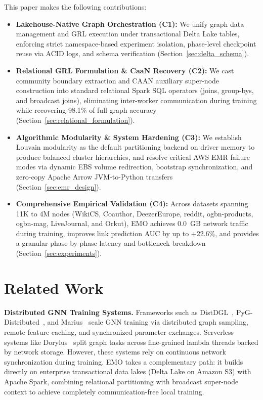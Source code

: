 \documentclass[conference,compsoc]{IEEEtran}
\begin{document}
This paper makes the following contributions:
\begin{itemize}
    \item \textbf{Lakehouse-Native Graph Orchestration (C1):} We unify graph data management and GRL execution under transactional Delta Lake tables, enforcing strict namespace-based experiment isolation, phase-level checkpoint reuse via ACID logs, and schema verification (Section~\ref{sec:delta_schema}).
    \item \textbf{Relational GRL Formulation \& CaaN Recovery (C2):} We cast community boundary extraction and CAAN auxiliary super-node construction into standard relational Spark SQL operators (joins, group-bys, and broadcast joins), eliminating inter-worker communication during training while recovering 98.1\% of full-graph accuracy (Section~\ref{sec:relational_formulation}).
    \item \textbf{Algorithmic Modularity \& System Hardening (C3):} We establish Louvain modularity as the default partitioning backend on driver memory to produce balanced cluster hierarchies, and resolve critical AWS EMR failure modes via dynamic EBS volume redirection, bootstrap synchronization, and zero-copy Apache Arrow JVM-to-Python transfers (Section~\ref{sec:emr_design}).
    \item \textbf{Comprehensive Empirical Validation (C4):} Across datasets spanning 11K to 4M nodes (WikiCS, Coauthor, DeezerEurope, reddit, ogbn-products, ogbn-mag, LiveJournal, and Orkut), EMO achieves 0.0~GB network traffic during training, improves link prediction AUC by up to +22.6\%, and provides a granular phase-by-phase latency and bottleneck breakdown (Section~\ref{sec:experiments}).
\end{itemize}

\section{Related Work}

\textbf{Distributed GNN Training Systems.}
Frameworks such as DistDGL~\cite{zheng2020distdgl}, PyG-Distributed~\cite{fey2019pyg}, and Marius~\cite{mohyuddin2021marius} scale GNN training via distributed graph sampling, remote feature caching, and synchronized parameter exchanges. Serverless systems like Dorylus~\cite{thorpe2021dorylus} split graph tasks across fine-grained lambda threads backed by network storage. However, these systems rely on continuous network synchronization during training. EMO takes a complementary path: it builds directly on enterprise transactional data lakes (Delta Lake on Amazon S3) with Apache Spark, combining relational partitioning with broadcast super-node context to achieve completely communication-free local training.
\end{document}
